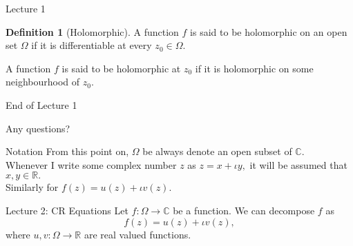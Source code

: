 \documentclass[handout, dvipsnames]{beamer}
\theoremstyle{definition}
\newtheorem{defn}{Definition}
\newtheorem{rem}{Remark}
\begin{document}
\begin{frame}{Lecture 1}
    \begin{defn}[Holomorphic]
        A function $f$ is said to be holomorphic on an open set $\Omega$ if it is differentiable at every $z_0 \in \Omega.$

        A function $f$ is said to be holomorphic at $z_0$ if it is holomorphic on some neighbourhood of $z_0.$
    \end{defn}
\end{frame}
\begin{frame}{End of Lecture 1}
    \begin{tcolorbox}
        Any questions?
    \end{tcolorbox}
\end{frame}
\begin{frame}{Notation}
    From this point on, $\Omega$ be always denote an open subset of $\mathbb{C}.$\\
    Whenever I write some complex number $z$ as $z = x + \iota y,$ it will be assumed that $x, y \in \mathbb{R}.$\\
    Similarly for $f(z) = u(z) + \iota v(z).$
\end{frame}
\begin{frame}{Lecture 2: CR Equations}
    Let $f:\Omega \to \mathbb{C}$ be a function. We can decompose $f$ as
    \begin{equation*} 
        f(z) = u(z) + \iota v(z),
    \end{equation*}
    where $u, v : \Omega \to \mathbb{R}$ are real valued functions.

\end{frame}
    
\end{document}
